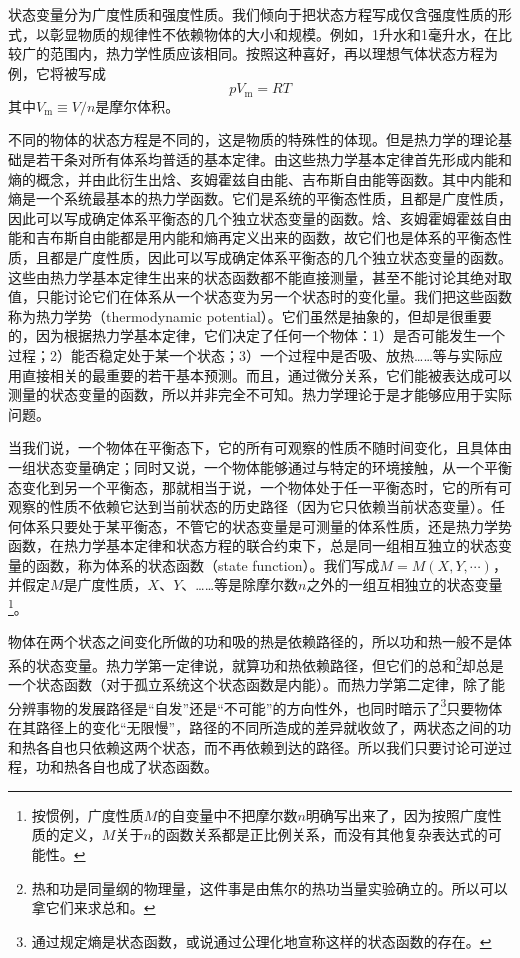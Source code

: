 \documentclass[main.tex]{subfiles}
\begin{document}
状态变量分为广度性质和强度性质。我们倾向于把状态方程写成仅含强度性质的形式，以彰显物质的规律性不依赖物体的大小和规模。例如，1升水和1毫升水，在比较广的范围内，热力学性质应该相同。按照这种喜好，再以理想气体状态方程为例，它将被写成
\[pV_\text{m}=RT\]
其中$V_\text{m}\equiv V/n$是摩尔体积。

不同的物体的状态方程是不同的，这是物质的特殊性的体现。但是热力学的理论基础是若干条对所有体系均普适的基本定律。由这些热力学基本定律首先形成内能和熵的概念，并由此衍生出焓、亥姆霍兹自由能、吉布斯自由能等函数。其中内能和熵是一个系统最基本的热力学函数。它们是系统的平衡态性质，且都是广度性质，因此可以写成确定体系平衡态的几个独立状态变量的函数。焓、亥姆霍姆霍兹自由能和吉布斯自由能都是用内能和熵再定义出来的函数，故它们也是体系的平衡态性质，且都是广度性质，因此可以写成确定体系平衡态的几个独立状态变量的函数。这些由热力学基本定律生出来的状态函数都不能直接测量，甚至不能讨论其绝对取值，只能讨论它们在体系从一个状态变为另一个状态时的变化量。我们把这些函数称为热力学势（thermodynamic potential）。它们虽然是抽象的，但却是很重要的，因为根据热力学基本定律，它们决定了任何一个物体：1）是否可能发生一个过程；2）能否稳定处于某一个状态；3）一个过程中是否吸、放热……等与实际应用直接相关的最重要的若干基本预测。而且，通过微分关系，它们能被表达成可以测量的状态变量的函数，所以并非完全不可知。热力学理论于是才能够应用于实际问题。

当我们说，一个物体在平衡态下，它的所有可观察的性质不随时间变化，且具体由一组状态变量确定；同时又说，一个物体能够通过与特定的环境接触，从一个平衡态变化到另一个平衡态，那就相当于说，一个物体处于任一平衡态时，它的所有可观察的性质不依赖它达到当前状态的历史路径（因为它只依赖当前状态变量）。任何体系只要处于某平衡态，不管它的状态变量是可测量的体系性质，还是热力学势函数，在热力学基本定律和状态方程的联合约束下，总是同一组相互独立的状态变量的函数，称为体系的状态函数（state function）。我们写成$M=M\left(X,Y,\cdots\right)$，并假定$M$是广度性质，$X$、$Y$、……等是除摩尔数$n$之外的一组互相独立的状态变量\footnote{按惯例，广度性质$M$的自变量中不把摩尔数$n$明确写出来了，因为按照广度性质的定义，$M$关于$n$的函数关系都是正比例关系，而没有其他复杂表达式的可能性。}。

物体在两个状态之间变化所做的功和吸的热是依赖路径的，所以功和热一般不是体系的状态变量。热力学第一定律说，就算功和热依赖路径，但它们的总和\footnote{热和功是同量纲的物理量，这件事是由焦尔的热功当量实验确立的。所以可以拿它们来求总和。}却总是一个状态函数（对于孤立系统这个状态函数是内能）。而热力学第二定律，除了能分辨事物的发展路径是“自发”还是“不可能”的方向性外，也同时暗示了\footnote{通过规定熵是状态函数，或说通过公理化地宣称这样的状态函数的存在。}只要物体在其路径上的变化“无限慢”，路径的不同所造成的差异就收敛了，两状态之间的功和热各自也只依赖这两个状态，而不再依赖到达的路径。所以我们只要讨论可逆过程，功和热各自也成了状态函数。
\end{document}
